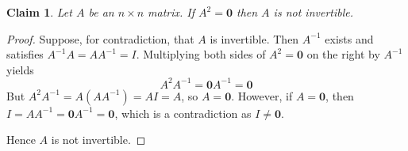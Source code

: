 \documentclass{article}
\newtheorem*{claim}{Claim}
\begin{document}
\begin{claim}
    Let $A$ be an $n \times n$ matrix. If $A^2 = \mathbf{0}$ then $A$ is not invertible.
\end{claim}

\begin{proof}
    Suppose, for contradiction, that $A$ is invertible. Then $A^{-1}$ exists and satisfies 
    $A^{-1}A = AA^{-1} = I$. Multiplying both sides of $A^2 = \mathbf{0}$ on the right by $A^{-1}$ yields
    \[
    A^2A^{-1} = \mathbf{0}A^{-1} = \mathbf{0}
    \]
    But $A^2A^{-1} = A(AA^{-1}) = AI = A$, so $A = \mathbf{0}$. However, if $A = \mathbf{0}$, then 
    $I = AA^{-1} = \mathbf{0}A^{-1} = \mathbf{0}$, which is a contradiction as $I \neq \mathbf{0}$.

    \medskip

    Hence $A$ is not invertible.
\end{proof}
\end{document}

